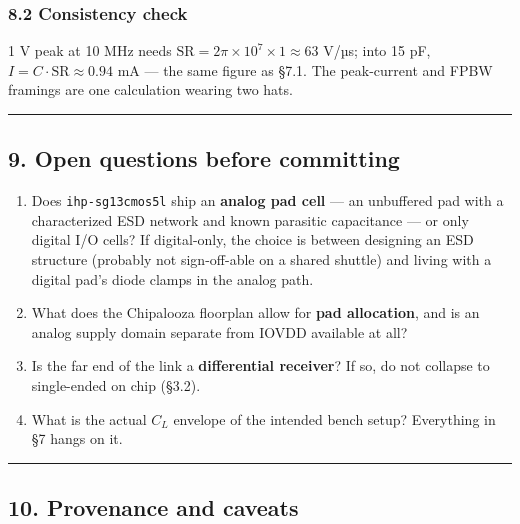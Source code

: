 \documentclass[
  10pt,
  a4paper,
]{article}
\providecommand{\tightlist}{%
  \setlength{\itemsep}{0pt}\setlength{\parskip}{0pt}}
\begin{document}
\hypertarget{consistency-check}{%
\subsubsection{8.2 Consistency check}\label{consistency-check}}

1 V peak at 10 MHz needs
\(\mathrm{SR} = 2\pi\times10^7\times1 \approx 63\) V/µs; into 15 pF,
\(I = C\cdot\mathrm{SR} \approx 0.94\) mA --- the same figure as §7.1.
The peak-current and FPBW framings are one calculation wearing two hats.

\begin{center}\rule{0.5\linewidth}{0.5pt}\end{center}

\hypertarget{open-questions-before-committing}{%
\subsection{9. Open questions before
committing}\label{open-questions-before-committing}}

\begin{enumerate}
\def\labelenumi{\arabic{enumi}.}
\tightlist
\item
  Does \texttt{ihp-sg13cmos5l} ship an \textbf{analog pad cell} --- an
  unbuffered pad with a characterized ESD network and known parasitic
  capacitance --- or only digital I/O cells? If digital-only, the choice
  is between designing an ESD structure (probably not sign-off-able on a
  shared shuttle) and living with a digital pad's diode clamps in the
  analog path.
\item
  What does the Chipalooza floorplan allow for \textbf{pad allocation},
  and is an analog supply domain separate from IOVDD available at all?
\item
  Is the far end of the link a \textbf{differential receiver}? If so, do
  not collapse to single-ended on chip (§3.2).
\item
  What is the actual \(C_L\) envelope of the intended bench setup?
  Everything in §7 hangs on it.
\end{enumerate}

\begin{center}\rule{0.5\linewidth}{0.5pt}\end{center}

\hypertarget{provenance-and-caveats}{%
\subsection{10. Provenance and caveats}\label{provenance-and-caveats}}
\end{document}
